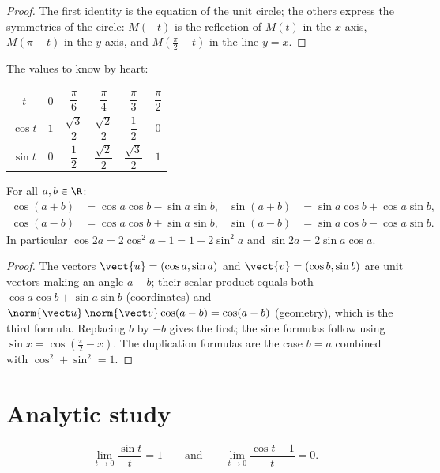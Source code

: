 \begin{proof}
The first identity is the equation of the unit circle; the others express the
symmetries of the circle: $M(-t)$ is the reflection of $M(t)$ in the
$x$-axis, $M(\pi - t)$ in the $y$-axis, and $M(\frac\pi2 - t)$ in the line
$y = x$.
\end{proof}

The values to know by heart:
\begin{center}
\begin{tabular}{c|ccccc}
$t$ & $0$ & $\dfrac{\pi}{6}$ & $\dfrac{\pi}{4}$ & $\dfrac{\pi}{3}$ & $\dfrac{\pi}{2}$\\[6pt]
\hline\rule{0pt}{14pt}%
$\cos t$ & $1$ & $\dfrac{\sqrt3}{2}$ & $\dfrac{\sqrt2}{2}$ & $\dfrac12$ & $0$\\[6pt]
$\sin t$ & $0$ & $\dfrac12$ & $\dfrac{\sqrt2}{2}$ & $\dfrac{\sqrt3}{2}$ & $1$
\end{tabular}
\end{center}

\begin{proposition}\label{prop:tle:trigo:addition}
For all $a, b \in \R$:
\begin{align*}
\cos(a+b) &= \cos a \cos b - \sin a \sin b, &
\sin(a+b) &= \sin a \cos b + \cos a \sin b,\\
\cos(a-b) &= \cos a \cos b + \sin a \sin b, &
\sin(a-b) &= \sin a \cos b - \cos a \sin b.
\end{align*}
In particular $\cos 2a = 2\cos^2 a - 1 = 1 - 2\sin^2 a$ and
$\sin 2a = 2 \sin a \cos a$.
\end{proposition}

\begin{proof}
The vectors $\vect{u} = (\cos a, \sin a)$ and $\vect{v} = (\cos b, \sin b)$
are unit vectors making an angle $a - b$; their scalar product equals both
$\cos a\cos b + \sin a \sin b$ (coordinates) and
$\norm{\vect u}\,\norm{\vect v}\cos(a-b) = \cos(a - b)$ (geometry), which is
the third formula. Replacing $b$ by $-b$ gives the first; the sine formulas
follow using $\sin x = \cos(\frac\pi2 - x)$. The duplication formulas are the
case $b = a$ combined with $\cos^2 + \sin^2 = 1$.
\end{proof}

\section{Analytic study}

\begin{lemma}\label{lem:tle:trigo:sinxx}
\[
\lim_{t \to 0} \frac{\sin t}{t} = 1
\qquad\text{and}\qquad
\lim_{t \to 0} \frac{\cos t - 1}{t} = 0 .
\]
\end{lemma}

